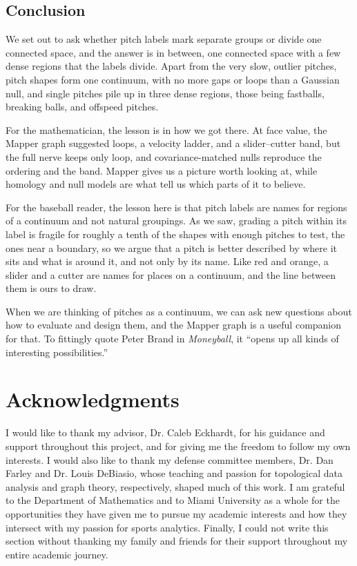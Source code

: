 \documentclass[11pt]{article}
\theoremstyle{definition}
\theoremstyle{remark}
\begin{document}
\subsection{Conclusion}\label{sec:conclusion}
We set out to ask whether pitch labels mark separate groups or divide one connected space, and the answer is in between, one connected space with a few dense regions that the labels divide.
Apart from the very slow, outlier pitches, pitch shapes form one continuum, with no more gaps or loops than a Gaussian null, and single pitches pile up in three dense regions, those being fastballs, breaking balls, and offspeed pitches.

For the mathematician, the lesson is in how we got there.
At face value, the Mapper graph suggested \GraphBone{} loops, a velocity ladder, and a slider--cutter band, but the full nerve keeps only \NerveBone{} loop, and covariance-matched nulls reproduce the ordering and the band.
Mapper gives us a picture worth looking at, while homology and null models are what tell us which parts of it to believe.

For the baseball reader, the lesson here is that pitch labels are names for regions of a continuum and not natural groupings.
As we saw, grading a pitch within its label is fragile for roughly a tenth of the shapes with enough pitches to test, the ones near a boundary, so we argue that a pitch is better described by where it sits and what is around it, and not only by its name.
Like red and orange, a slider and a cutter are names for places on a continuum, and the line between them is ours to draw.

When we are thinking of pitches as a continuum, we can ask new questions about how to evaluate and design them, and the Mapper graph is a useful companion for that. To fittingly quote Peter Brand in \emph{Moneyball}, it ``opens up all kinds of interesting possibilities.''

\section*{Acknowledgments}
I would like to thank my advisor, Dr. Caleb Eckhardt, for his guidance and support throughout this project, and for giving me the freedom to follow my own interests.
I would also like to thank my defense committee members, Dr. Dan Farley and Dr. Louis DeBiasio, whose teaching and passion for topological data analysis and graph theory, respectively, shaped much of this work.
I am grateful to the Department of Mathematics and to Miami University as a whole for the opportunities they have given me to pursue my academic interests and how they intersect with my passion for sports analytics.
Finally, I could not write this section without thanking my family and friends for their support throughout my entire academic journey.
\end{document}
